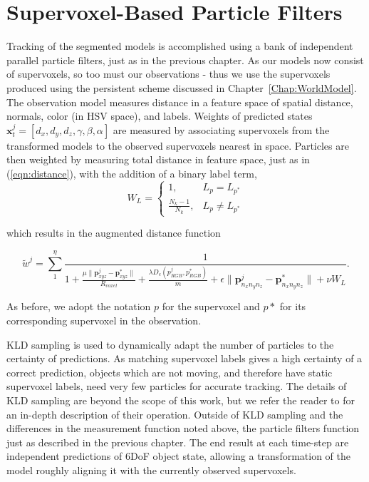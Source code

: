 \section{Supervoxel-Based Particle Filters}
Tracking of the segmented models is accomplished using a bank of independent parallel particle filters, just as in the previous chapter. As our models now consist of supervoxels, so too must our observations - thus we use the supervoxels produced using the persistent scheme discussed in Chapter~\ref{Chap:WorldModel}. The observation model measures distance in a feature space of spatial distance, normals, color (in HSV space), and labels. Weights of predicted states $\mathbf{x}^j_t = [d_x, d_y, d_z, \gamma, \beta, \alpha]$ are measured by associating supervoxels from the transformed models to the observed supervoxels nearest in space. Particles are then weighted by measuring total distance in feature space, just as in (\ref{eqn:distance}), with the addition of a binary label term,
\begin{equation}
  \label{eqn:dist_labels}
    W_L =  \begin{cases} 1, & L_p = L_{p^*} \\ 
                         \frac{N_k-1}{N_k}, & L_p \neq L_{p^*} 
           \end{cases} 
\end{equation}

which results in the augmented distance function

\begin{equation} \label{eqn:augmented_distance}
  \tilde{w}^j = \sum_{1}^{\eta} \frac{1}{1 + \frac {\mu \lVert \mathbf{p}^j_{xyz} - \mathbf{p}^*_{xyz} \rVert} {R_{voxel}} +  \frac{\lambda D_c(p^j_{RGB},p^*_{RGB})}{m} +   \epsilon \lVert \mathbf{p}^j_{n_x n_y n_z} - \mathbf{p}^*_{n_x n_y n_z} \rVert + \nu  W_L}.
\end{equation}

As before, we adopt the notation $p$ for the supervoxel and $p*$ for its corresponding supervoxel in the observation.

KLD sampling \cite{KLDParticleFilter} is used to dynamically adapt the number of particles to the certainty of predictions. As matching supervoxel labels gives a high certainty of a correct prediction, objects which are not moving, and therefore have static supervoxel labels, need very few particles for accurate tracking. The details of KLD sampling are beyond the scope of this work, but we refer the reader to \cite{KLDParticleFilter} for an in-depth description of their operation. Outside of KLD sampling and the differences in the measurement function noted above, the particle filters function just as described in the previous chapter. The end result at each time-step are independent predictions of 6DoF object state, allowing a transformation of the model roughly aligning it with the currently observed supervoxels.  


